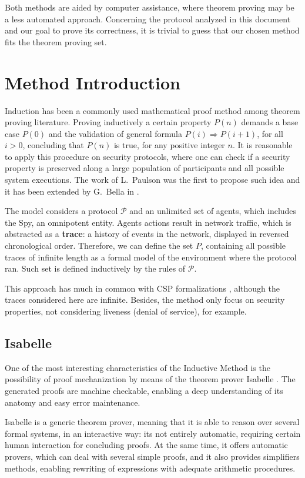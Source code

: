 Both methods are aided by computer assistance, where theorem proving may be a less automated approach. Concerning the protocol analyzed in this document and our goal to prove its correctness, it is trivial to guess that our chosen method fits the theorem proving set.

\section{Method Introduction}
Induction has been a commonly used mathematical proof method among theorem proving literature. Proving inductively a certain property $P(n)$ demands a base case $P(0)$ and the validation of general formula $P(i) \Rightarrow P(i + 1)$, for all $i > 0$, concluding that $P(n)$ is true, for any positive integer $n$. It is reasonable to apply this procedure on security protocols, where one can check if a security property is preserved along a large population of participants and all possible system executions. The work of L.~Paulson \cite{paulson-inductive} was the first to propose such idea and it has been extended by G.~Bella in \cite{bella-book}.

The model considers a protocol $\mathcal{P}$ and an unlimited set of agents, which includes the Spy, an omnipotent entity. Agents actions result in network traffic, which is abstracted as a \textbf{trace}: a history of events in the network, displayed in reversed chronological order. Therefore, we can define the set $P$, containing all possible traces of infinite length as a formal model of the environment where the protocol ran. Such set is defined inductively by the rules of $\mathcal{P}$.

This approach has much in common with CSP formalizations \cite{ryan-schneider}, although the traces considered here are infinite. Besides, the method only focus on security properties, not considering liveness (denial of service), for example.

\subsection{Isabelle}
One of the most interesting characteristics of the Inductive Method is the possibility of proof mechanization by means of the theorem prover Isabelle \cite{isabelle}. The generated proofs are machine checkable, enabling a deep understanding of its anatomy and easy error maintenance.

Isabelle is a generic theorem prover, meaning that it is able to reason over several formal systems, in an interactive way: its not entirely automatic, requiring certain human interaction for concluding proofs. At the same time, it offers automatic provers, which can deal with several simple proofs, and it also provides simplifiers methods, enabling rewriting of expressions with adequate arithmetic procedures.

